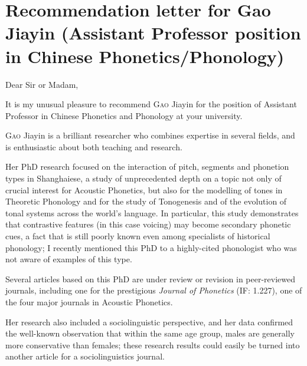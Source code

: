 \documentclass[oldfontcommands,oneside,a4paper,11pt]{article}
\begin{document}
 
{
}

\section*{Recommendation letter for Gao Jiayin (Assistant  Professor  position  in  Chinese  Phonetics/Phonology)}


\begin{center}

 Dear Sir or Madam, 
\end{center}  

It is my unusual pleasure to recommend \textsc{Gao} Jiayin for the position of Assistant Professor in Chinese Phonetics and Phonology at your university.

\textsc{Gao} Jiayin is a brilliant researcher who combines expertise in several fields, and is enthusiastic about both teaching and research.

Her PhD research focused on the interaction of pitch, segments and phonetion types in Shanghaiese, a study of unprecedented depth on a topic not only of crucial interest for Acoustic Phonetics, but also for the modelling of tones in Theoretic Phonology and  for the study of Tonogenesis and of the evolution of tonal systems across the world's language. In particular, this study demonstrates that contrastive features (in this case voicing) may become secondary phonetic cues, a fact that is still poorly known even among specialists of historical phonology; I recently mentioned this PhD to a highly-cited phonologist who was not aware of examples of this type.

Several articles based on this PhD are under review or revision in peer-reviewed journals, including one for the prestigious \textit{Journal of Phonetics} (IF: 1.227), one of the four major journals in Acoustic Phonetics.

Her research also included a sociolinguistic perspective, and her data confirmed the well-known observation that within the same age group, males are generally more conservative than females; these research results could easily be turned into another article for a sociolinguistics journal. 
\end{document}
